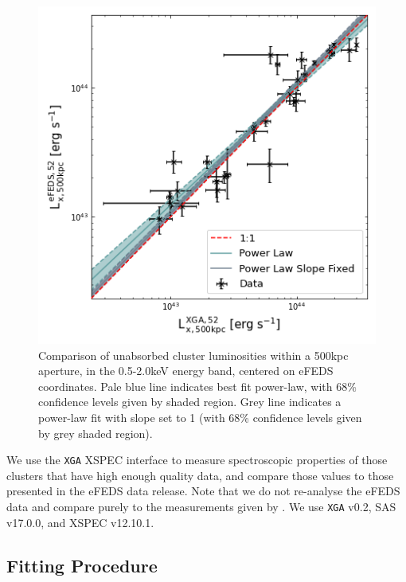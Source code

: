 \documentclass[fleqn,usenatbib]{mnras}
\begin{document}
\begin{figure}
    \centering
    \includegraphics[width=0.95\columnwidth]{images/efeds_xcs_l500cal.png}
    \caption[]{Comparison of unabsorbed cluster luminosities within a 500kpc aperture, in the 0.5-2.0keV energy band, centered on eFEDS coordinates. Pale blue line indicates best fit power-law, with 68\% confidence levels given by shaded region. Grey line indicates a power-law fit with slope set to 1 (with 68\% confidence levels given by grey shaded region).}
    \label{fig:l500kpccomp}
\end{figure}

We use the \texttt{XGA} XSPEC \citep[][]{xspec} interface to measure spectroscopic properties of those clusters that have high enough quality data, and compare those values to those presented in the eFEDS data release. Note that we do not re-analyse the eFEDS data and compare purely to the measurements given by \cite{efedsclustercat}. We use \texttt{XGA} v0.2, SAS v17.0.0, and XSPEC v12.10.1.

\subsection{Fitting Procedure}
\label{subsec:fitproc}
\end{document}
